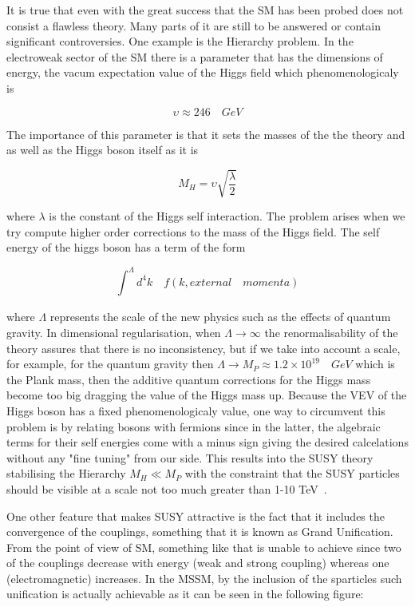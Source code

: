 \documentclass[12pt,a4paper]{report}
\begin{document}
It is true that even with the great success that the SM has been probed does not consist a flawless theory.
Many parts of it are still to be answered or contain significant controversies. One example is the Hierarchy 
problem. In the electroweak sector of the SM there is a parameter that has the dimensions of energy, the 
vacum expectation value of the Higgs field which phenomenologicaly is 

\begin{equation}
 \upsilon \approx 246 \quad GeV
\end{equation}

The importance of this parameter is that it sets the masses of the the theory and as well as the Higgs boson
itself as it is

\begin{equation}
 M_{H} = \upsilon \sqrt{\frac{\lambda}{2}} 
\end{equation}


where $\lambda$ is the constant of the Higgs self interaction. The problem arises when we try compute higher 
order corrections to the mass of the Higgs field. The self energy of the higgs boson has a term of the form

\begin{equation}
 \int_{}^{\Lambda} d^{4}k \quad f(k,external\quad momenta)
\end{equation}

where $\Lambda$ represents the scale of the new physics such as the effects of quantum gravity. In dimensional 
regularisation, when $\Lambda \rightarrow \infty$ the renormalisability of the theory assures that there
is no inconsistency, but if we take into account a scale, for example, for the quantum gravity then $\Lambda \rightarrow 
M_{P} \approx 1.2\times 10^{19}\quad GeV$ which is the Plank mass, then the additive quantum corrections for the Higgs 
mass become too big dragging the value of the Higgs mass up. Because the VEV of the Higgs boson has a fixed 
phenomenologicaly value, one way to circumvent this problem is by relating bosons with fermions since in the 
latter, the algebraic terms for their self energies come with a minus sign giving the desired calcelations 
without any "fine tuning" from our side. This results into the SUSY theory stabilising the Hierarchy $M_{H}
\ll M_{P}$ with the constraint that the SUSY particles should be visible at a scale not too much greater 
than 1-10 TeV~\cite{aitchison2005supersymmetry}.

One other feature that makes SUSY attractive is the fact that it includes the convergence of the couplings,
something that it is known as Grand Unification. From the point of view of SM, something like that is 
unable to achieve since two of the couplings decrease with energy (weak and strong coupling) whereas one
(electromagnetic) increases. In the MSSM, by the inclusion of the sparticles such unification is actually
achievable as it can be seen in the following figure:
\end{document}
